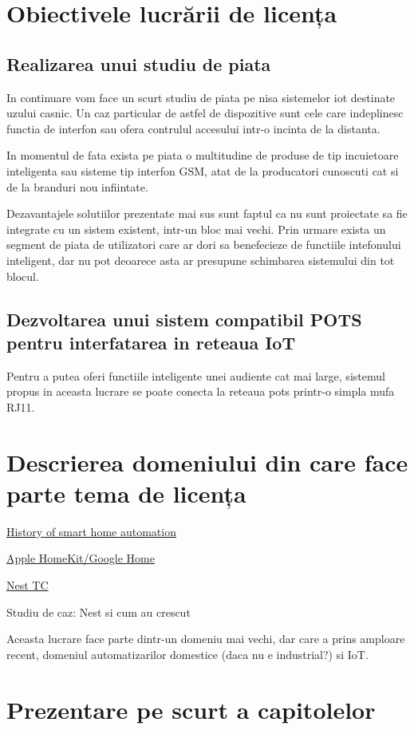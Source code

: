 \section {Obiectivele lucrării de licența}

\subsection {Realizarea unui studiu de piata}

In continuare vom face un scurt studiu de piata pe nisa sistemelor \acrfull{iot} destinate uzului casnic. Un caz particular de astfel de dispozitive sunt cele care indeplinesc functia de interfon sau ofera contrulul accesului intr-o incinta de la distanta.

In momentul de fata exista pe piata o multitudine de produse de tip incuietoare inteligenta sau sisteme tip interfon GSM, atat de la producatori cunoscuti cat si de la branduri nou infiintate.

Dezavantajele solutiilor prezentate mai sus sunt faptul ca nu sunt proiectate sa fie integrate cu un sistem existent, intr-un bloc mai vechi. Prin urmare exista un segment de piata de utilizatori care ar dori sa benefecieze de functiile intefonului inteligent, dar nu pot deoarece asta ar presupune schimbarea sistemului din tot blocul.

\subsection {Dezvoltarea unui sistem compatibil POTS pentru interfatarea in reteaua IoT}

Pentru a putea oferi functiile inteligente unei audiente cat mai large, sistemul propus in aceasta lucrare se poate conecta la reteaua \acrfull{pots} printr-o simpla mufa RJ11.

\section {Descrierea domeniului din care face parte tema de licența}

\href{https://zeusintegrated.com/blog/item/a-brief-history-of-smart-home-automation}{History of smart home automation}

\href{https://www.familyhandyman.com/article/the-history-of-smart-home-technology/}{Apple HomeKit/Google Home}

\href{https://techcrunch.com/2013/05/11/from-the-garage-to-200-employees-in-3-years-how-nest-thermostats-were-born/}{Nest TC}

Studiu de caz: Nest si cum au crescut


Aceasta lucrare face parte dintr-un domeniu mai vechi, dar care a prins amploare recent, domeniul automatizarilor domestice (daca nu e industrial?) si IoT. 

\section {Prezentare pe scurt a capitolelor}

